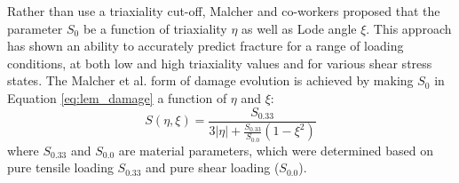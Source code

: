 \documentclass[sn-mathphys,Numbered,draft]{sn-jnl}%
\begin{document}




Rather than use a triaxiality cut-off, Malcher and co-workers \citep{malcher_improved_2014, ferreira_improved_2022, castro_calibration_2018} proposed that the parameter $S_0$ be a function of triaxiality $\eta$ as well as Lode angle $\xi$.
This approach has shown an ability to accurately predict fracture for a range of loading conditions, at both low and high triaxiality values and for various shear stress states.
The Malcher et al. form of damage evolution is achieved by making $S_0$ in Equation \ref{eq:lem_damage} a function of $\eta$ and $\xi$:
\begin{equation}
S(\eta,\xi)=\frac{S_{0.33}}{3|\eta|+\frac{S_{0.33}}{S_{0.0}}\left(1-\xi^2\right)}
\end{equation}
where $S_{0.33}$ and $S_{0.0}$ are material parameters, which were determined based on pure tensile loading $S_{0.33}$ and pure shear loading ($S_{0.0}$).

%
\end{document}
